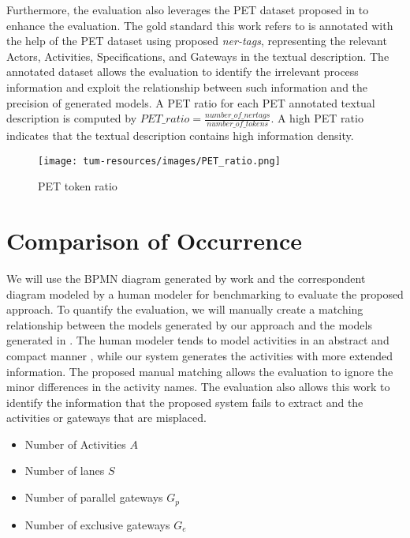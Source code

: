 Furthermore, the evaluation also leverages the PET dataset proposed in \cite{pet_dataset} to enhance the evaluation. The gold standard this work refers to is annotated with the help of the PET dataset using proposed \textit{ner-tags}, representing the relevant Actors, Activities, Specifications, and Gateways in the textual description. The annotated dataset allows the evaluation to identify the irrelevant process information and exploit the relationship between such information and the precision of generated models. A PET ratio for each PET annotated textual description is computed by $PET\_ratio = \frac{number\_of\_ner tags}{number\_of\_tokens}$. A high PET ratio indicates that the textual description contains high information density.

\begin{figure}[h]
    \centering
    \caption{PET token ratio}
    \texttt{[image: tum-resources/images/PET\_ratio.png]}
\end{figure}

\section{Comparison of Occurrence}
We will use the BPMN diagram generated by work \cite{t2m_1_main} and the correspondent diagram modeled by a human modeler for benchmarking to evaluate the proposed approach. To quantify the evaluation, we will manually create a matching relationship between the models generated by our approach and the models generated in \cite{t2m_1_main}. The human modeler tends to model activities in an abstract and compact manner \cite{t2m_1_main}, while our system generates the activities with more extended information. The proposed manual matching allows the evaluation to ignore the minor differences in the activity names. The evaluation also allows this work to identify the information that the proposed system fails to extract and the activities or gateways that are misplaced. 

\begin{itemize}
    \item Number of Activities $A$
    \item Number of lanes $S$
    \item Number of parallel gateways $G_p$
    \item Number of exclusive gateways $G_e$
\end{itemize}

